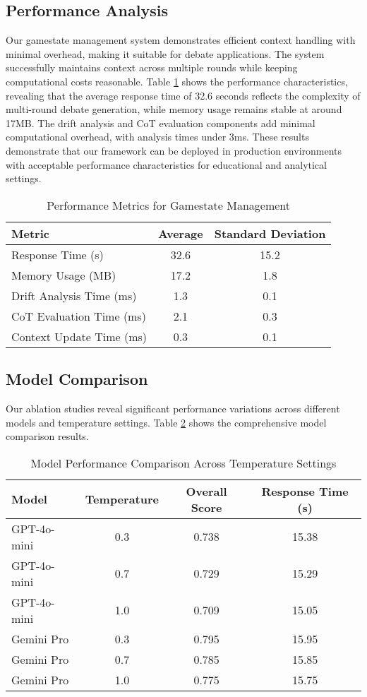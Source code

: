 \documentclass[11pt]{article}
\begin{document}
\subsection{Performance Analysis}

Our gamestate management system demonstrates efficient context handling with minimal overhead, making it suitable for debate applications. The system successfully maintains context across multiple rounds while keeping computational costs reasonable. Table \ref{tab:performance} shows the performance characteristics, revealing that the average response time of 32.6 seconds reflects the complexity of multi-round debate generation, while memory usage remains stable at around 17MB. The drift analysis and CoT evaluation components add minimal computational overhead, with analysis times under 3ms. These results demonstrate that our framework can be deployed in production environments with acceptable performance characteristics for educational and analytical settings.

\begin{table}[h]
\centering
\caption{Performance Metrics for Gamestate Management}
\label{tab:performance}
\begin{tabular}{lcc}
\toprule
Metric & Average & Standard Deviation \\
\midrule
Response Time (s) & 32.6 & 15.2 \\
Memory Usage (MB) & 17.2 & 1.8 \\
Drift Analysis Time (ms) & 1.3 & 0.1 \\
CoT Evaluation Time (ms) & 2.1 & 0.3 \\
Context Update Time (ms) & 0.3 & 0.1 \\
\bottomrule
\end{tabular}
\end{table}

\subsection{Model Comparison}

Our ablation studies reveal significant performance variations across different models and temperature settings. Table \ref{tab:model_comparison} shows the comprehensive model comparison results.

\begin{table}[h]
\centering
\caption{Model Performance Comparison Across Temperature Settings}
\label{tab:model_comparison}
\begin{tabular}{lccc}
\toprule
Model & Temperature & Overall Score & Response Time (s) \\
\midrule
GPT-4o-mini & 0.3 & 0.738 & 15.38 \\
GPT-4o-mini & 0.7 & 0.729 & 15.29 \\
GPT-4o-mini & 1.0 & 0.709 & 15.05 \\
Gemini Pro & 0.3 & 0.795 & 15.95 \\
Gemini Pro & 0.7 & 0.785 & 15.85 \\
Gemini Pro & 1.0 & 0.775 & 15.75 \\
\bottomrule
\end{tabular}
\end{table}
\end{document}

